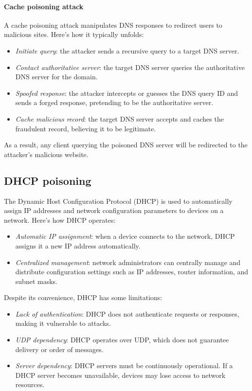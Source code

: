 \paragraph*{Cache poisoning attack}
A cache poisoning attack manipulates DNS responses to redirect users to malicious sites. 
Here's how it typically unfolds:
\begin{itemize}
    \item \textit{Initiate query}: the attacker sends a recursive query to a target DNS server.
    \item \textit{Contact authoritative server}: the target DNS server queries the authoritative DNS server for the domain.
    \item \textit{Spoofed response}: the attacker intercepts or guesses the DNS query ID and sends a forged response, pretending to be the authoritative server.
    \item \textit{Cache malicious record}: the target DNS server accepts and caches the fraudulent record, believing it to be legitimate.
\end{itemize}
As a result, any client querying the poisoned DNS server will be redirected to the attacker's malicious website.

\subsection{DHCP poisoning}
The Dynamic Host Configuration Protocol (DHCP) is used to automatically assign IP addresses and network configuration parameters to devices on a network. 
Here's how DHCP operates:
\begin{itemize}
    \item \textit{Automatic IP assignment}: when a device connects to the network, DHCP assigns it a new IP address automatically.
    \item \textit{Centralized management}: network administrators can centrally manage and distribute configuration settings such as IP addresses, router information, and subnet masks.
\end{itemize}
Despite its convenience, DHCP has some limitations:
\begin{itemize}
    \item \textit{Lack of authentication}: DHCP does not authenticate requests or responses, making it vulnerable to attacks.
    \item \textit{UDP dependency}: DHCP operates over UDP, which does not guarantee delivery or order of messages.
    \item \textit{Server dependency}: DHCP servers must be continuously operational.
        If a DHCP server becomes unavailable, devices may lose access to network resources.
\end{itemize}


